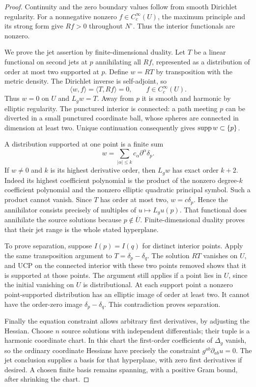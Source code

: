 \begin{proof}
Continuity and the zero boundary values follow from smooth Dirichlet
regularity. For a nonnegative nonzero $f\in C_c^\infty(U)$,
the maximum principle and its strong form give $Rf>0$ throughout
$N^\circ$. Thus the interior functionals are nonzero.

We prove the jet assertion by finite-dimensional duality. Let $T$
be a linear functional on second jets at $p$ annihilating all
$Rf$, represented as a distribution of order at most two supported
at $p$. Define $w=RT$ by transposition with the metric density.
The Dirichlet inverse is self-adjoint, so
\[
 \langle w,f\rangle=\langle T,Rf\rangle=0,
           \qquad f\in C_c^\infty(U).
\]
Thus $w=0$ on $U$ and $L_gw=T$. Away from $p$ it is smooth and
harmonic by elliptic regularity. The punctured interior is connected:
a path meeting $p$ can be diverted in a small punctured coordinate
ball, whose spheres are connected in dimension at least two.
Unique continuation consequently gives $\operatorname{supp} w\subset\{p\}$.

A distribution supported at one point is a finite sum
\[
 w=\sum_{|\alpha|\le k}c_\alpha\partial^\alpha\delta_p.
\]
If $w\ne0$ and $k$ is its highest derivative order, then $L_gw$
has exact order $k+2$. Indeed its highest coefficient polynomial
is the product of the nonzero degree-$k$ coefficient polynomial
and the nonzero elliptic quadratic principal symbol. Such a product
cannot vanish. Since $T$ has order at most two, $w=c\delta_p$.
Hence the annihilator consists precisely of multiples of
$u\mapsto L_gu(p)$. That functional does annihilate the source
solutions because $p\notin\overline U$. Finite-dimensional duality
proves that their jet range is the whole stated hyperplane.

To prove separation, suppose $I(p)=I(q)$ for distinct interior
points. Apply the same transposition argument to
$T=\delta_p-\delta_q$. The solution $RT$ vanishes on $U$,
and UCP on the connected interior with these two points removed
shows that it is supported at those points. The argument still
applies if a point lies in $U$, since the initial vanishing on $U$
is distributional. At each support point a nonzero point-supported
distribution has an elliptic image of order at least two.
It cannot have the order-zero image $\delta_p-\delta_q$.
This contradiction proves separation.

Finally the equation constraint allows arbitrary first derivatives,
by adjusting the Hessian. Choose $n$ source solutions with independent
differentials; their tuple is a harmonic coordinate chart. In this
chart the first-order coefficients of $\Delta_g$ vanish, so the
ordinary coordinate Hessians have precisely the constraint
$g^{ab}\partial_{ab}u=0$. The jet conclusion supplies a basis for
that hyperplane, with zero first derivatives if desired. A chosen
finite basis remains spanning, with a positive Gram bound, after
shrinking the chart.
\end{proof}

